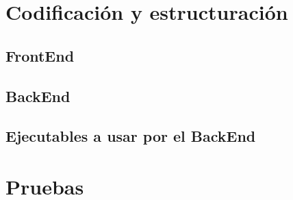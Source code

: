 \newpage
\section{Codificación y estructuración}

\bigskip
\subsection{FrontEnd}
\bigskip



\bigskip
\subsection{BackEnd}
\bigskip



\bigskip
\subsection{Ejecutables a usar por el BackEnd}
\bigskip



\newpage
\section{Pruebas}



